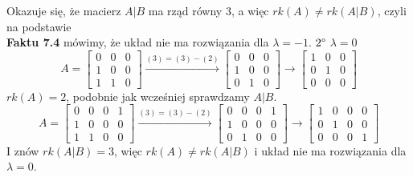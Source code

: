 \documentclass[12pt,a4paper]{article}
\begin{document}
Okazuje się, że macierz \(A|B\) ma rząd równy 3, a więc \(rk(A)\ne rk(A|B)\), czyli na podstawie\\ \textbf{Faktu 7.4} mówimy, że układ nie ma rozwiązania dla \(\lambda=-1\).
\vskip 0.4cm
\noindent
\textbf{\(2\degree\)} \(\lambda=0\)
\[
A=
\left[
\begin{array}{ccc}
0 & 0 & 0\\
1 & 0 & 0\\
1 & 1 & 0
\end{array}\right]
\xrightarrow{(3)=(3)-(2)}
\left[
\begin{array}{ccc}
0 & 0 & 0\\
1 & 0 & 0\\
0 & 1 & 0
\end{array}\right]
\xrightarrow{}
\left[
\begin{array}{ccc}
1 & 0 & 0\\
0 & 1 & 0\\
0 & 0 & 0
\end{array}\right]
\]
\(rk(A)=2\), podobnie jak wcześniej sprawdzamy \(A|B\).
\[
A=
\left[
\begin{array}{cccc}
0 & 0 & 0 & 1\\
1 & 0 & 0 & 0\\
1 & 1 & 0 & 0
\end{array}\right]
\xrightarrow{(3)=(3)-(2)}
\left[
\begin{array}{cccc}
0 & 0 & 0 & 1\\
1 & 0 & 0 & 0\\
0 & 1 & 0 & 0
\end{array}\right]
\xrightarrow{}
\left[
\begin{array}{cccc}
1 & 0 & 0 & 0\\
0 & 1 & 0 & 0\\
0 & 0 & 0 & 1
\end{array}\right]
\]
I znów \(rk(A|B) = 3\), więc \(rk(A)\ne rk(A|B)\) i układ nie ma rozwiązania dla \(\lambda = 0\).
\end{document}
